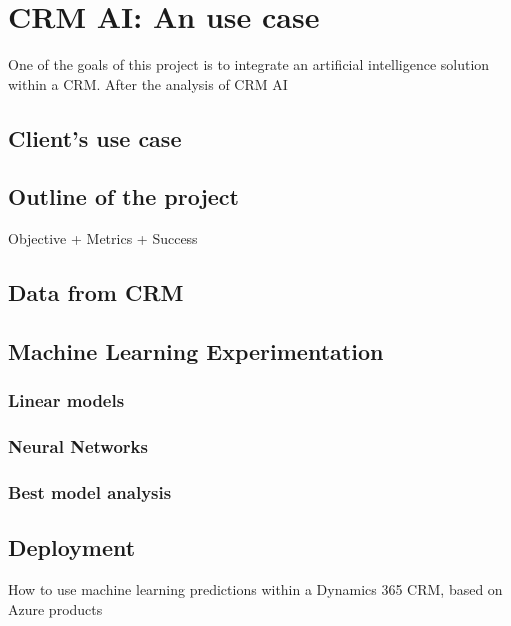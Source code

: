 \chapter{CRM AI: An use case}

One of the goals of this project is to integrate an artificial intelligence solution within a CRM. After the analysis of CRM AI

\section{Client's use case}
\lipsum[1]


\section{Outline of the project}
Objective + Metrics + Success

\lipsum[1]

\section{Data from CRM}
\lipsum[1]


\section{Machine Learning Experimentation}
\lipsum[1]

\subsection{Linear models}
\lipsum[2]

\subsection{Neural Networks}
\lipsum[3]

\subsection{Best model analysis}
\lipsum[3]


\section{Deployment}
How to use machine learning predictions within a Dynamics 365 CRM, based on Azure products


